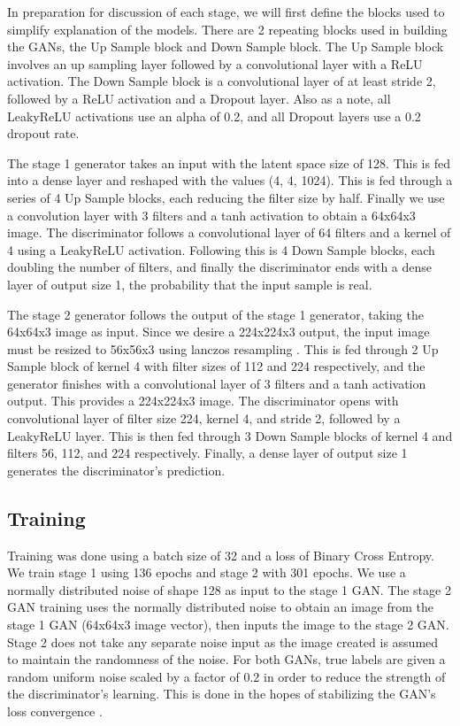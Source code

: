 \documentclass{article}
\begin{document}
	In preparation for discussion of each stage, we will first define the blocks used to simplify explanation of the models. There are 2 repeating blocks used in building the GANs, the Up Sample block and Down Sample block. The Up Sample block involves an up sampling layer followed by a convolutional layer with a ReLU activation. The Down Sample block is a convolutional layer of at least stride 2, followed by a ReLU activation and a Dropout layer. Also as a note, all LeakyReLU activations use an alpha of 0.2, and all Dropout layers use a 0.2 dropout rate.

	The stage 1 generator takes an input with the latent space size of 128. This is fed into a dense layer and reshaped with the values (4, 4, 1024). This is fed through a series of 4 Up Sample blocks, each reducing the filter size by half. Finally we use a convolution layer with 3 filters and a tanh activation to obtain a 64x64x3 image. The discriminator follows a convolutional layer of 64 filters and a kernel of 4 using a LeakyReLU activation. Following this is 4 Down Sample blocks, each doubling the number of filters, and finally the discriminator ends with a dense layer of output size 1, the probability that the input sample is real.

	The stage 2 generator follows the output of the stage 1 generator, taking the 64x64x3 image as input. Since we desire a 224x224x3 output, the input image must be resized to 56x56x3 using lanczos resampling \cite{lanczos}. This is fed through 2 Up Sample block of kernel 4 with filter sizes of 112 and 224 respectively, and the generator finishes with a convolutional layer of 3 filters  and a tanh activation output. This provides a 224x224x3 image. The discriminator opens with convolutional layer of filter size 224, kernel 4, and stride 2, followed by a LeakyReLU layer. This is then fed through 3 Down Sample blocks of kernel 4 and filters 56, 112, and 224 respectively. Finally, a dense layer of output size 1 generates the discriminator’s prediction.

	\subsection{Training}
	Training was done using a batch size of 32 and a loss of Binary Cross Entropy. We train stage 1 using 136 epochs and stage 2 with 301 epochs. We use a normally distributed noise of shape 128 as input to the stage 1 GAN. The stage 2 GAN training uses the normally distributed noise to obtain an image from the stage 1 GAN (64x64x3 image vector), then inputs the image to the stage 2 GAN. Stage 2 does not take any separate noise input as the image created is assumed to maintain the randomness of the noise.  For both GANs, true labels are given a random uniform noise scaled by a factor of 0.2 in order to reduce the strength of the discriminator’s learning. This is done in the hopes of stabilizing the GAN’s loss convergence \cite{salimans2016improved}.
\end{document}
